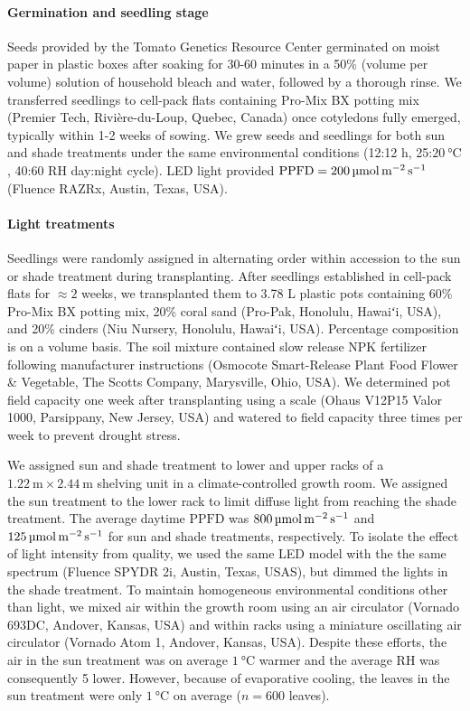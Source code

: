 \documentclass[
  letterpaper,
  DIV=11,
  numbers=noendperiod]{scrartcl}
\let\oldparagraph\paragraph
\renewcommand{\paragraph}[1]{\oldparagraph{#1}\mbox{}}
\newcommand{\ppfd}{$\mathrm{PPFD}$}
\newcommand{\ppfdqty}[1]{$\qty{#1}{\micro\mol\raiseto{-2}\meter\raiseto{-1}\second}$}
\begin{document}
\paragraph{Germination and seedling
stage}\label{germination-and-seedling-stage}

Seeds provided by the Tomato Genetics Resource Center germinated on
moist paper in plastic boxes after soaking for 30-60 minutes in a 50\%
(volume per volume) solution of household bleach and water, followed by
a thorough rinse. We transferred seedlings to cell-pack flats containing
Pro-Mix BX potting mix (Premier Tech, Rivière-du-Loup, Quebec, Canada)
once cotyledons fully emerged, typically within 1-2 weeks of sowing. We
grew seeds and seedlings for both sun and shade treatments under the
same environmental conditions (12:12 h, 25:\(\qty{20}{\degreeCelsius}\),
40:60 RH day:night cycle). LED light provided
\(\mathrm{PPFD} = \qty{200}{\micro\mol\raiseto{-2}\meter\raiseto{-1}\second}\)
(Fluence RAZRx, Austin, Texas, USA).

\paragraph{Light treatments}\label{light-treatments}

Seedlings were randomly assigned in alternating order within accession
to the sun or shade treatment during transplanting. After seedlings
established in cell-pack flats for \(\approx 2\) weeks, we transplanted
them to 3.78 L plastic pots containing 60\% Pro-Mix BX potting mix, 20\%
coral sand (Pro-Pak, Honolulu, Hawaiʻi, USA), and 20\% cinders (Niu
Nursery, Honolulu, Hawaiʻi, USA). Percentage composition is on a volume
basis. The soil mixture contained slow release NPK fertilizer following
manufacturer instructions (Osmocote Smart-Release Plant Food Flower \&
Vegetable, The Scotts Company, Marysville, Ohio, USA). We determined pot
field capacity one week after transplanting using a scale (Ohaus V12P15
Valor 1000, Parsippany, New Jersey, USA) and watered to field capacity
three times per week to prevent drought stress.

We assigned sun and shade treatment to lower and upper racks of a
\(\qty{1.22}{\meter} \times \qty{2.44}{\meter}\) shelving unit in a
climate-controlled growth room. We assigned the sun treatment to the
lower rack to limit diffuse light from reaching the shade treatment. The
average daytime \ppfd{} was \ppfdqty{800} and \ppfdqty{125} for sun and
shade treatments, respectively. To isolate the effect of light intensity
from quality, we used the same LED model with the the same spectrum
(Fluence SPYDR 2i, Austin, Texas, USAS), but dimmed the lights in the
shade treatment. To maintain homogeneous environmental conditions other
than light, we mixed air within the growth room using an air circulator
(Vornado 693DC, Andover, Kansas, USA) and within racks using a miniature
oscillating air circulator (Vornado Atom 1, Andover, Kansas, USA).
Despite these efforts, the air in the sun treatment was on average
\(\qty{1}{\degreeCelsius}\) warmer and the average RH was consequently 5
lower. However, because of evaporative cooling, the leaves in the sun
treatment were only \(\qty{1}{\degreeCelsius}\) on average (\(n = 600\)
leaves).
\end{document}
